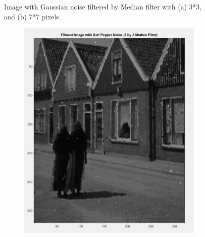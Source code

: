 \begin{figure}
\begin{subfigure}{0.4\textwidth}
        \caption{}
        \label{fig:Second}
    \end{subfigure}
    \caption{Image with Gaussian noise filtered by Median filter with (a) 3*3, and (b) 7*7 pixels}
    \label{fig:Gaussian noise filtered by Median filter}
\end{figure}

\begin{figure}
    \centering
    \begin{subfigure}{0.4\textwidth}
        \includegraphics[width=\textwidth]{Resources/F9-a.png}
        \caption{}
        \label{fig:first}
    \end{subfigure}
    \hfill
    \begin{subfigure}{0.4\textwidth}

\end{subfigure}
\end{figure}
